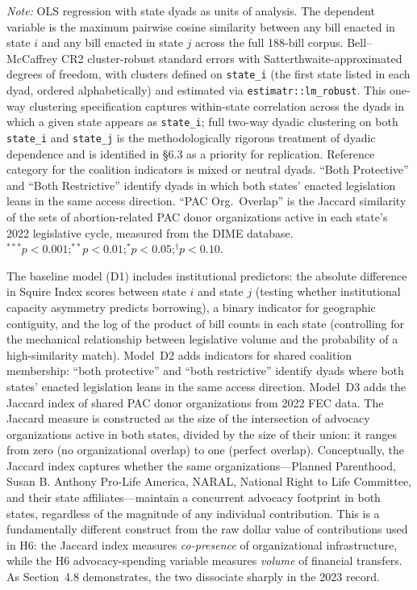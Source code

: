 \begin{table}[htbp]
{\textit{Note:} OLS regression with state dyads as units of analysis. The dependent variable is the maximum pairwise cosine similarity between any bill enacted in state $i$ and any bill enacted in state $j$ across the full 188-bill corpus. Bell--McCaffrey CR2 cluster-robust standard errors with Satterthwaite-approximated degrees of freedom, with clusters defined on \texttt{state\_i} (the first state
listed in each dyad, ordered alphabetically) and estimated via \texttt{estimatr::lm\_robust}. This one-way clustering specification captures within-state correlation across the dyads in which a given state appears as \texttt{state\_i}; full two-way dyadic clustering on both \texttt{state\_i} and \texttt{state\_j} \parencite{aronow2015clusterrobustvarianceestimationdyadic} is the methodologically rigorous treatment of dyadic dependence and is identified in §6.3 as a priority for replication. Reference category for the coalition indicators is mixed or neutral dyads. ``Both Protective'' and ``Both Restrictive'' identify dyads in which both states' enacted legislation leans in the same access direction. ``PAC Org.\ Overlap'' is the Jaccard similarity of the sets of abortion-related PAC donor organizations active in each state's 2022 legislative cycle, measured from the DIME database.\\[2pt]
$^{***}p < 0.001$;\enspace $^{**}p < 0.01$;\enspace $^{*}p < 0.05$;\enspace $^{\dagger}p < 0.10$.}
\end{table}

The baseline model (D1) includes institutional predictors: the absolute difference in Squire Index scores between state $i$ and state $j$ (testing whether institutional capacity asymmetry predicts borrowing), a binary indicator for geographic contiguity, and the log of the product of bill counts in each state (controlling for the mechanical relationship between legislative volume and the probability of a high-similarity match). Model~D2 adds indicators for shared coalition membership: ``both protective'' and ``both restrictive'' identify dyads where both states' enacted legislation leans in the same access direction. Model~D3 adds the Jaccard index of shared PAC donor organizations from 2022 FEC data. The Jaccard measure is constructed as the size of the intersection of advocacy organizations active in both states, divided by the size of their union: it ranges from zero (no organizational overlap) to one (perfect overlap). Conceptually, the Jaccard index captures whether the same organizations---Planned Parenthood, Susan B. Anthony Pro-Life America, NARAL, National Right to Life Committee, and their state affiliates---maintain a concurrent advocacy footprint in both states, regardless of the magnitude of any individual contribution. This is a fundamentally different construct from the raw dollar value of contributions used in H6: the Jaccard index measures \textit{co-presence} of organizational infrastructure, while the H6 advocacy-spending variable measures \textit{volume} of financial transfers. As Section~4.8 demonstrates, the two dissociate sharply in the 2023 record.

